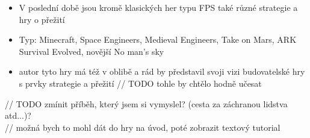 \begin{itemize}
	\item V poslední době jsou kromě klasických her typu FPS také různé strategie a hry o přežití
	\item Typ: Minecraft, Space Engineers, Medieval Engineers, Take on Mars, ARK Survival Evolved, novější No man's sky
	\item autor tyto hry má též v oblibě a rád by představil svoji vizi budovatelské hry s prvky strategie a přežití		// TODO tohle by chtělo hodně učesat
\end{itemize}		

// TODO zmínit příběh, který jsem si vymyslel? (cesta za záchranou lidstva atd...)? \\

// možná bych to mohl dát do hry na úvod, poté zobrazit textový tutorial

\fi
